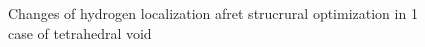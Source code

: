 \begin{figure}[ht]
\begin{minipage}[h]{0.49\linewidth}
\end{minipage}
\hfill
\begin{minipage}[ht]{0.49\linewidth}
\end{minipage}
\caption{Changes of hydrogen localization afret strucrural optimization in 1 case of tetrahedral void}
\label{ris:tet1}
\end{figure}

